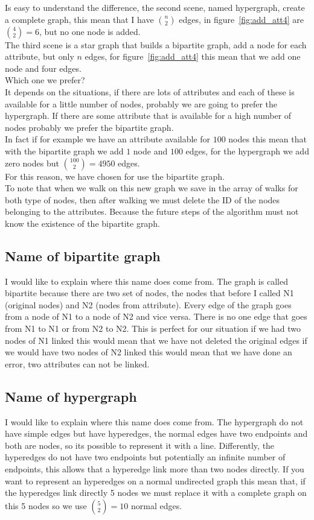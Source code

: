 \documentclass[epsfig,a4paper,11pt,titlepage,twoside,openany]{book}
\begin{document}
Is easy to understand the difference, the second scene, named hypergraph, create a complete graph, this mean that I have  $ \displaystyle\binom{n}{2}$ edges, in figure~\ref{fig:add_att4} are $ \displaystyle\binom{4}{2} = 6$, but no one node is added.\\
The third scene is a star graph that builds a bipartite graph, add a node for each attribute, but only $n$ edges, for figure~\ref{fig:add_att4} this mean that we add one node and four edges.\\
Which one we prefer?\\
It depends on the situations, if there are lots of attributes and each of these is available for a little number of nodes, probably we are going to prefer the hypergraph. If there are some attribute that is available for a high number of nodes probably we prefer the bipartite graph.\\
In fact if for example we have an attribute available for $100$ nodes this mean that with the bipartite graph we add $1$ node and $100$ edges, for the hypergraph we add zero nodes but $ \displaystyle\binom{100}{2} = 4950$ edges.\\
For this reason, we have chosen for use the bipartite graph.\\
To note that when we walk on this new graph we save in the array of walks for both type of nodes, then after walking we must delete the ID of the nodes belonging to the attributes. Because the future steps of the algorithm must not know the existence of the bipartite graph.
%
\subsection{Name of bipartite graph}
I would like to explain where this name does come from. The graph is called bipartite because there are two set of nodes, the nodes that before I called N1 (original nodes) and N2 (nodes from attribute). Every edge of the graph goes from a node of N1 to a node of N2 and vice versa. There is no one edge that goes from N1 to N1 or from N2 to N2. This is perfect for our situation if we had two nodes of N1 linked this would mean that we have not deleted the original edges if we would have two nodes of N2 linked this would mean that we have done an error, two attributes can not be linked.
%
\subsection{Name of hypergraph}
I would like to explain where this name does come from. The hypergraph do not have simple edges but have hyperedges, the normal edges have two endpoints and both are nodes, so its possible to represent it with a line. Differently, the hyperedges do not have two endpoints but potentially an infinite number of endpoints, this allows that a hyperedge link more than two nodes directly. If you want to represent an hyperedges on a normal undirected graph this mean that, if the hyperedges link directly 5 nodes we must replace it with a complete graph on this 5 nodes so we use $ \displaystyle\binom{5}{2} = 10$ normal edges.
\end{document}
